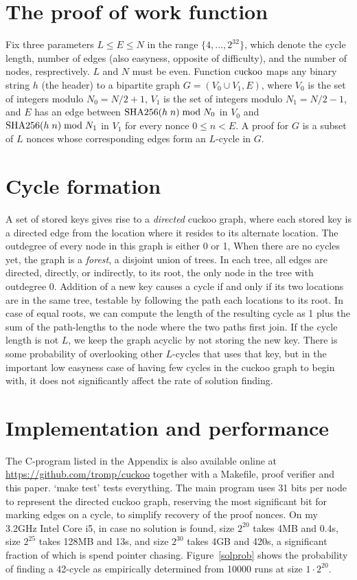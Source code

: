 \documentclass[11pt, oneside]{article}
\newcommand{\cuckoo}{{\rm cuckoo}}
\newcommand{\sha}{{\rm SHA256}}
\begin{document}
\section{The proof of work function}
Fix three parameters $L \leq E \leq N$ in the range $\{4,...,2^{32}\}$, which
denote the cycle length, number of edges (also easyness, opposite of difficulty),
and the number of nodes, resprectively. $L$ and $N$ must be even.
Function $\cuckoo$ maps any binary string $h$ (the header) to a bipartite graph
$G = (V_0 \cup V_1, E)$, where $V_0$ is the set of integers modulo $N_0=N/2+1$,
$V_1$ is the set of integers modulo $N_1=N/2-1$, and $E$ has an edge between
$\sha(h\;n) \bmod N_0$ in $V_0$ and $\sha(h\;n) \bmod N_1$ in $V_1$ for every
nonce $0 \leq n < E$. A proof for $G$ is a subset of $L$ nonces whose
corresponding edges form an $L$-cycle in $G$.

\section{Cycle formation}
A set of stored keys gives rise to a {\em directed} cuckoo graph, where each
stored key is a directed edge from the location where it resides to its
alternate location. The outdegree of every node in this
graph is either 0 or 1, When there are no cycles yet, the graph is a {\em
forest}, a disjoint union of trees. In each tree, all edges are directed,
directly, or indirectly, to its root,
the only node in the tree with outdegree 0. Addition of a new key causes a
cycle if and only if its two locations are in the same tree, testable
by following the path each locations to its root.
In case of equal roots, we can compute the length of the resulting cycle as
1 plus the sum of the path-lengths to the node where the two paths first join.
If the cycle length is not $L$, we keep the graph
acyclic by not storing the new key. There is some probability of overlooking
other $L$-cycles
that uses that key, but in the important low easyness case of having few cycles
in the cuckoo graph to begin with, it does not significantly affect
the rate of solution finding.

\section{Implementation and performance}
The C-program listed in the Appendix is also available online at
\url{https://github.com/tromp/cuckoo} together with a Makefile,
proof verifier and this paper. `make test' tests everything.
The main program uses 31 bits per node to represent the
directed cuckoo graph, reserving the most significant bit
for marking edges on a cycle, to simplify recovery of the proof nonces.
On my 3.2GHz Intel Core i5, in case no solution is found, size $2^{20}$ takes 4MB and 0.4s, size
$2^{25}$ takes 128MB and 13s, and size $2^{30}$ takes 4GB and 420s, a significant fraction of which
is spend pointer chasing.
Figure~\ref{solprob} shows the probability of finding a 42-cycle as empirically
determined from 10000 runs at size $1 \cdot 2^{20}$.
\end{document}
